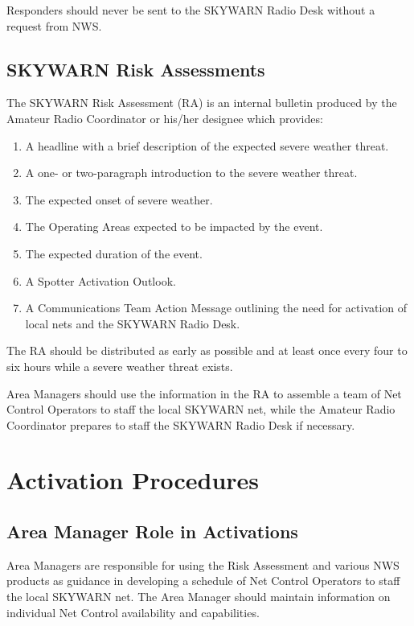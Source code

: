 \documentclass[pdflatex,letterpaper,twoside,12pt]{book}
\begin{document}
Responders should never be sent to the SKYWARN Radio Desk without a request from NWS.

\subsection{SKYWARN Risk Assessments}\label{risk-assessments}

The SKYWARN Risk Assessment (RA) is an internal bulletin produced by the Amateur Radio Coordinator or his/her designee which provides:

\begin{enumerate}
\item A headline with a brief description of the expected severe weather threat.
\item A one- or two-paragraph introduction to the severe weather threat.
\item The expected onset of severe weather.
\item The Operating Areas expected to be impacted by the event.
\item The expected duration of the event.
\item A Spotter Activation Outlook.
\item A Communications Team Action Message outlining the need for activation of local nets and the SKYWARN Radio Desk.
\end{enumerate}

The RA should be distributed as early as possible and at least once every four to six hours while a severe weather threat exists.

Area Managers should use the information in the RA to assemble a team of Net Control Operators to staff the local SKYWARN net, while the Amateur Radio Coordinator prepares to staff the SKYWARN Radio Desk if necessary.


\section{Activation Procedures}

\subsection{Area Manager Role in Activations}

Area Managers are responsible for using the Risk Assessment and various NWS products as guidance in developing a schedule of Net Control Operators to staff the local SKYWARN net.  The Area Manager should maintain information on individual Net Control availability and capabilities.
\end{document}
